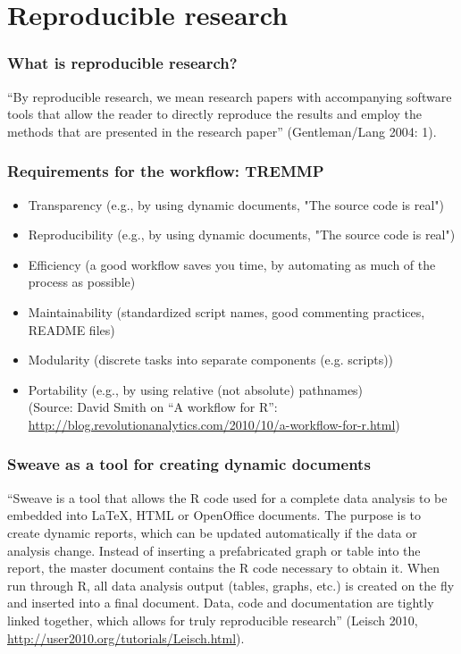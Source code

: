 \documentclass[bigger]{beamer}
\begin{document}
\section{Reproducible research}
\label{sec-2}
\begin{frame}
\frametitle{What is reproducible research?}
\label{sec-2_1}


``By reproducible research, we mean research papers with accompanying software tools that allow the
reader to directly reproduce the results and employ the methods that are presented in the research
paper'' (Gentleman/Lang 2004: 1). 
\end{frame}
\begin{frame}
\frametitle{Requirements for the workflow: TREMMP}
\label{sec-2_2}

\small
\begin{itemize}

\item Transparency (e.g., by using dynamic documents, "The source code is real")\\
\label{sec-2_2_1}%
\item Reproducibility (e.g., by using dynamic documents, "The source code is real")\\
\label{sec-2_2_2}%
\item Efficiency (a good workflow saves you time, by automating as much of the process as possible)\\
\label{sec-2_2_3}%
\item Maintainability (standardized script names, good commenting practices, README files)\\
\label{sec-2_2_4}%
\item Modularity (discrete tasks into separate components (e.g. scripts))\\
\label{sec-2_2_5}%
\item Portability (e.g., by using relative (not absolute) pathnames)\\
\label{sec-2_2_6}%
\vfill
\tiny
(Source: David Smith on ``A workflow for R'': \href{http://blog.revolutionanalytics.com/2010/10/a-workflow-for-r.html}{http://blog.revolutionanalytics.com/2010/10/a-workflow-for-r.html})


\end{itemize} %
\end{frame}
\begin{frame}
\frametitle{Sweave as a tool for creating dynamic documents}
\label{sec-2_3}


``Sweave is a tool that allows the R code used for a complete data analysis to be embedded into
\LaTeX{}, HTML or OpenOffice documents. The purpose is to create dynamic reports, which can be updated
automatically if the data or analysis change. Instead of inserting a prefabricated graph or table
into the report, the master document contains the R code necessary to obtain it. When run through R,
all data analysis output (tables, graphs, etc.) is created on the fly and inserted into a final
document. Data, code and documentation are tightly linked together, which allows for truly
reproducible research'' (Leisch 2010, \href{http://user2010.org/tutorials/Leisch.html}{http://user2010.org/tutorials/Leisch.html}). 

  
\end{frame}
\end{document}
